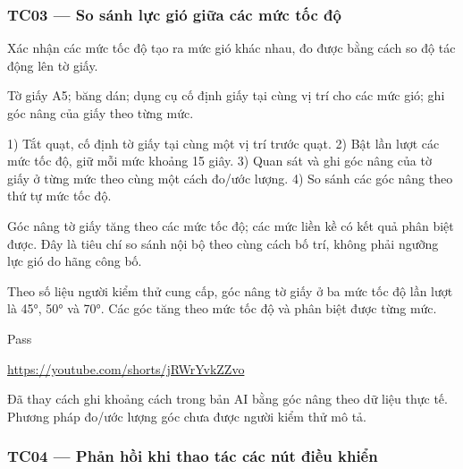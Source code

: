 \subsubsection{TC03 --- So sánh lực gió giữa các mức tốc độ}\label{tc03-so-suxe1nh-lux1ef1c-giuxf3-giux1eefa-cuxe1c-mux1ee9c-tux1ed1c-ux111ux1ed9}

\begin{description}
\tightlist
\item[Objective]
Xác nhận các mức tốc độ tạo ra mức gió khác nhau, đo được bằng cách so độ tác động lên tờ giấy.
\item[Input]
Tờ giấy A5; băng dán; dụng cụ cố định giấy tại cùng vị trí cho các mức gió; ghi góc nâng của giấy theo từng mức.
\item[Steps]
1) Tắt quạt, cố định tờ giấy tại cùng một vị trí trước quạt. 2) Bật lần lượt các mức tốc độ, giữ mỗi mức khoảng 15 giây. 3) Quan sát và ghi góc nâng của tờ giấy ở từng mức theo cùng một cách đo/ước lượng. 4) So sánh các góc nâng theo thứ tự mức tốc độ.
\item[Expected]
Góc nâng tờ giấy tăng theo các mức tốc độ; các mức liền kề có kết quả phân biệt được. Đây là tiêu chí so sánh nội bộ theo cùng cách bố trí, không phải ngưỡng lực gió do hãng công bố.
\item[Actual]
Theo số liệu người kiểm thử cung cấp, góc nâng tờ giấy ở ba mức tốc độ lần lượt là 45°, 50° và 70°. Các góc tăng theo mức tốc độ và phân biệt được từng mức.
\item[Verdict]
Pass
\item[Bằng chứng]
\url{https://youtube.com/shorts/jRWrYvkZZvo}
\item[Ghi chú rà soát]
Đã thay cách ghi khoảng cách trong bản AI bằng góc nâng theo dữ liệu thực tế. Phương pháp đo/ước lượng góc chưa được người kiểm thử mô tả.
\end{description}

\subsubsection{TC04 --- Phản hồi khi thao tác các nút điều khiển}\label{tc04-phux1ea3n-hux1ed3i-khi-thao-tuxe1c-cuxe1c-nuxfat-ux111iux1ec1u-khiux1ec3n}

